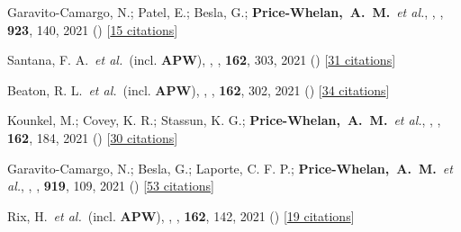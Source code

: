 \item[{\color{deemph}\scriptsize84}]Garavito-Camargo, N.; Patel, E.; Besla, G.; \textbf{Price-Whelan,~A.~M.}~\textit{et al.}, , \apj, \textbf{923}, 140, 2021 () [\href{http://adsabs.harvard.edu/abs/2021ApJ...923..140G}{15 citations}]

\item[{\color{deemph}\scriptsize83}]Santana, F. A.~\textit{et al.}~(incl. \textbf{APW}), , \aj, \textbf{162}, 303, 2021 () [\href{http://adsabs.harvard.edu/abs/2021AJ....162..303S}{31 citations}]

\item[{\color{deemph}\scriptsize82}]Beaton, R. L.~\textit{et al.}~(incl. \textbf{APW}), , \aj, \textbf{162}, 302, 2021 () [\href{http://adsabs.harvard.edu/abs/2021AJ....162..302B}{34 citations}]

\item[{\color{deemph}\scriptsize81}]Kounkel, M.; Covey, K. R.; Stassun, K. G.; \textbf{Price-Whelan,~A.~M.}~\textit{et al.}, , \aj, \textbf{162}, 184, 2021 () [\href{http://adsabs.harvard.edu/abs/2021AJ....162..184K}{30 citations}]

\item[{\color{deemph}\scriptsize80}]Garavito-Camargo, N.; Besla, G.; Laporte, C. F. P.; \textbf{Price-Whelan,~A.~M.}~\textit{et al.}, , \apj, \textbf{919}, 109, 2021 () [\href{http://adsabs.harvard.edu/abs/2021ApJ...919..109G}{53 citations}]

\item[{\color{deemph}\scriptsize79}]Rix, H.~\textit{et al.}~(incl. \textbf{APW}), , \aj, \textbf{162}, 142, 2021 () [\href{http://adsabs.harvard.edu/abs/2021AJ....162..142R}{19 citations}]

